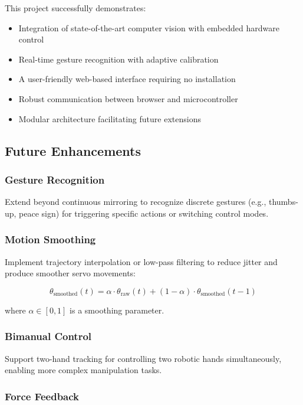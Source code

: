 \documentclass[12pt]{article}
\begin{document}
This project successfully demonstrates:
\begin{itemize}
    \item Integration of state-of-the-art computer vision with embedded hardware control
    \item Real-time gesture recognition with adaptive calibration
    \item A user-friendly web-based interface requiring no installation
    \item Robust communication between browser and microcontroller
    \item Modular architecture facilitating future extensions
\end{itemize}

\subsection{Future Enhancements}

\subsubsection{Gesture Recognition}

Extend beyond continuous mirroring to recognize discrete gestures (e.g., thumbs-up, peace sign) for triggering specific actions or switching control modes.

\subsubsection{Motion Smoothing}

Implement trajectory interpolation or low-pass filtering to reduce jitter and produce smoother servo movements:

\begin{equation}
    \theta_{\text{smoothed}}(t) = \alpha \cdot \theta_{\text{raw}}(t) + (1-\alpha) \cdot \theta_{\text{smoothed}}(t-1)
\end{equation}

where $\alpha \in [0,1]$ is a smoothing parameter.

\subsubsection{Bimanual Control}

Support two-hand tracking for controlling two robotic hands simultaneously, enabling more complex manipulation tasks.

\subsubsection{Force Feedback}
\end{document}
